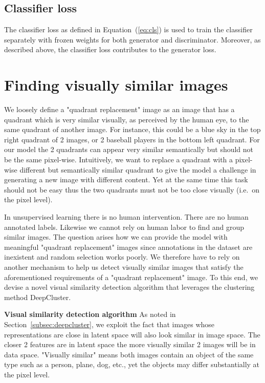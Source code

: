 \documentclass[a4paper,12pt]{report}
\begin{document}
\subsection{Classifier loss}
The classifier loss as defined in Equation~(\ref{eq:cls}) is used to train the classifier separately with frozen weights for both generator and discriminator. Moreover, as described above, the classifier loss contributes to the generator loss.



\section{Finding visually similar images} \label{subsec:img_clustering}
We loosely define a "quadrant replacement" image as an image that has a quadrant which is very similar visually, as perceived by the human eye, to the same quadrant of another image. For instance, this could be a blue sky in the top right quadrant of 2 images, or 2 baseball players in the bottom left quadrant. For our model the 2 quadrants can appear very similar semantically but should not be the same pixel-wise. Intuitively, we want to replace a quadrant with a pixel-wise different but semantically similar quadrant to give the model a challenge in generating a new image with different content. Yet at the same time this task should not be easy thus the two quadrants must not be too close visually (i.e.\ on the pixel level).

In unsupervised learning there is no human intervention. There are no human annotated labels. Likewise we cannot rely on human labor to find and group similar images. The question arises how we can provide the model with meaningful "quadrant replacement" images since annotations in the dataset are inexistent and random selection works poorly. We therefore have to rely on another mechanism to help us detect visually similar images that satisfy the aforementioned requirements of a "quadrant replacement" image. To this end, we devise a novel visual similarity detection algorithm that leverages the clustering method DeepCluster.

\textbf{Visual similarity detection algorithm} As noted in Section~\ref{subsec:deepcluster}, we exploit the fact that images whose representations are close in latent space will also look similar in image space. The closer 2 features are in latent space the more visually similar 2 images will be in data space. "Visually similar" means both images contain an object of the same type such as a person, plane, dog, etc., yet the objects may differ substantially at the pixel level.
\end{document}
